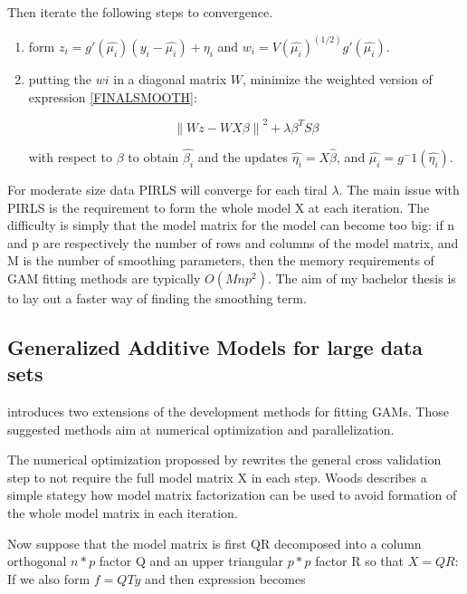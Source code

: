 \documentclass{article}
\begin{document}
    Then iterate the following steps to convergence.
    \begin{enumerate}
    \item form $z_i = g'(\widehat{\mu_i})(y_i − \widehat{\mu_i}) + \eta_i$ and $w_i = V(\widehat{\mu_i})^(1/2) g'(\widehat{\mu_i})$.
    \item putting the $wi$ in a diagonal matrix $W$, minimize the weighted version of expression \ref{FINALSMOOTH}:

    \begin{equation} \label{FINALSMOOTHW} \left \| Wz - WX\beta  \right \|^2 + \lambda \beta^T S\beta  \end{equation}


    with respect to $\beta$ to obtain $\widehat{\beta_i}$ and the updates $\widehat{\eta_i} =X\widehat{\beta}$, and $\widehat{\mu_i} =g^-1(\widehat{\eta_i})$.
    \end{enumerate}

    For moderate size data PIRLS will converge for each tiral $\lambda$. The main issue with PIRLS is the requirement to form the whole model X at each iteration. The difficulty is simply that the model matrix for the model can become too big: if n and p are respectively the number of rows and columns of the model matrix, and M is the number of smoothing parameters, then the memory requirements of GAM fitting methods are typically $O(Mnp^2)$. The aim of my bachelor thesis is to lay out a faster way of finding the smoothing term.



    \subsection{Generalized Additive Models for large data sets}
    \cite{bigdataGAM} introduces two extensions of the development methods for fitting GAMs. Those suggested methods aim at numerical optimization and parallelization.

    The numerical optimization propossed by \cite{bigdataGAM} rewrites the general cross validation step to not require the full model matrix X in each step. Woods describes a simple stategy how model matrix factorization can be used to avoid formation of the whole model matrix in each iteration.

    Now suppose that the model matrix is first QR decomposed into a column orthogonal $n * p$ factor Q and an upper triangular $p * p$ factor R so that $X=QR$: If we also form $f =QTy$ and then expression \label{FINALSMOOTH} becomes
\end{document}
